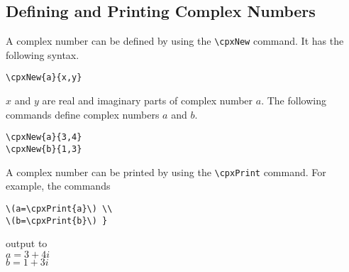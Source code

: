 \documentclass{article}
\begin{document}
\subsection{Defining and Printing Complex Numbers}
A complex number can be defined by using the \verb|\cpxNew| command. It has the following syntax.
\begin{lstlisting}
\cpxNew{a}{x,y}
\end{lstlisting}
\(x\) and \(y\) are  real and imaginary parts of   complex number \(a\).
The following commands define complex numbers \( a \) and \(b\).
\begin{lstlisting}
\cpxNew{a}{3,4}
\cpxNew{b}{1,3}
\end{lstlisting}
A complex number can be printed by using the \verb|\cpxPrint| command. For example, the commands
 \begin{lstlisting}
\(a=\cpxPrint{a}\) \\
\(b=\cpxPrint{b}\) }
\end{lstlisting}
output to \\
\(a = 3 + 4i\)\\
\(b = 1 + 3i\)
\end{document}

